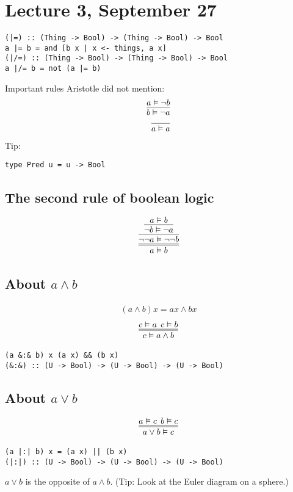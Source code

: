 \documentclass{article}
\theoremstyle{sltheorem}
\begin{document}
\section{Lecture 3, September 27}
\begin{verbatim}
(|=) :: (Thing -> Bool) -> (Thing -> Bool) -> Bool
a |= b = and [b x | x <- things, a x]
(|/=) :: (Thing -> Bool) -> (Thing -> Bool) -> Bool
a |/= b = not (a |= b)
\end{verbatim}
Important rules Aristotle did not mention:
\begin{align}
    \infer{b \vDash \neg a}{a \vDash \neg b}\\
    \infer{a \vDash a}{}
\end{align}
Tip:
\begin{verbatim}
type Pred u = u -> Bool
\end{verbatim}
\subsection{The second rule of boolean logic}
\begin{align}
    \infer={a\vDash b}{
        \infer{\neg\neg a \vDash \neg\neg b}{
            \infer{\neg b \vDash \neg a}{
                a \vDash b
            }
        }
    }
\end{align}
\subsection{About $a\wedge b$}
\begin{align}
    (a\wedge b)x = ax \wedge bx
\end{align}
\begin{align}
    \infer={c\vDash a\wedge b}{c\vDash a \:\: c\vDash b}
\end{align}
\begin{verbatim}
(a &:& b) x (a x) && (b x)
(&:&) :: (U -> Bool) -> (U -> Bool) -> (U -> Bool)
\end{verbatim}
\subsection{About $a\vee b$}
\begin{align}
\infer={a\vee b \vDash c}{a \vDash c \:\: b\vDash c}
\end{align}
\begin{verbatim}
(a |:| b) x = (a x) || (b x)
(|:|) :: (U -> Bool) -> (U -> Bool) -> (U -> Bool)
\end{verbatim}
$a\vee b$ is the opposite of $a\wedge b$. (Tip: Look at the Euler diagram on a sphere.)
\end{document}
